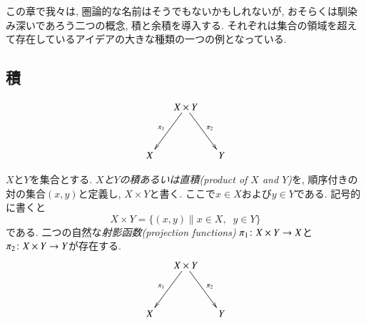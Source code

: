 この章で我々は, 圏論的な名前はそうでもないかもしれないが, おそらくは馴染み深いであろう二つの概念, 積と余積を導入する. それぞれは集合の領域を超えて存在しているアイデアの大きな種類の一つの例となっている.


\subsection{積}\label{sec:products}

\begin{definition}

$$\xymatrix@=15pt{&X\times Y\ar[ddr]^{\pi_2}\ar[ddl]_{\pi_1}\\\\X&&Y}$$

$X$と$Y$を集合とする. \emph{$X$と$Y$の積あるいは直積(product of $X$ and $Y$)}を, 順序付きの対の集合$(x,y)$と定義し, $X\times Y$と書く. ここで$x\in X$および$y\in Y$である. 記号的に書くと$$X\times Y=\{(x,y)\|x\in X,\;\; y\in Y\}$$である. 二つの自然な\emph{射影函数(projection functions)} $\pi_1\colon X\times Y\rightarrow X$と$\pi_2\colon X\times Y\rightarrow Y$が存在する. 
$$\xymatrix@=15pt{&X\times Y\ar[ddr]^{\pi_2}\ar[ddl]_{\pi_1}\\\\X&&Y}$$

\end{definition}

